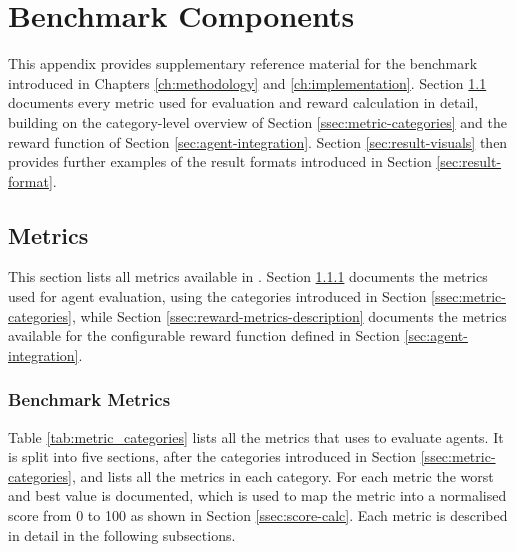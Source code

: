 \chapter{Benchmark Components}\label{ch:appendix}
This appendix provides supplementary reference material for the benchmark introduced in Chapters \ref{ch:methodology} and \ref{ch:implementation}. Section \ref{sec:metrics-description} documents every metric used for evaluation and reward calculation in detail, building on the category-level overview of Section \ref{ssec:metric-categories} and the reward function of Section \ref{sec:agent-integration}. Section \ref{sec:result-visuals} then provides further examples of the result formats introduced in Section \ref{sec:result-format}.


\section{Metrics}\label{sec:metrics-description}
This section lists all metrics available in \benchmark. Section \ref{ssec:bench-metrics-description} documents the metrics used for agent evaluation, using the categories introduced in Section \ref{ssec:metric-categories}, while Section \ref{ssec:reward-metrics-description} documents the metrics available for the configurable reward function defined in Section \ref{sec:agent-integration}.


\subsection{Benchmark Metrics}\label{ssec:bench-metrics-description}
Table \ref{tab:metric_categories} lists all the metrics that \benchmark uses to evaluate agents. It is split into five sections, after the categories introduced in Section \ref{ssec:metric-categories}, and lists all the metrics in each category. For each metric the worst and best value is documented, which is used to map the metric into a normalised score from 0 to 100 as shown in Section \ref{ssec:score-calc}. Each metric is described in detail in the following subsections.

